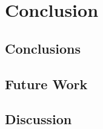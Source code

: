 \chapter{Conclusion}
\label{chap:conclusion}

\section{Conclusions}

\section{Future Work}

\section{Discussion}
